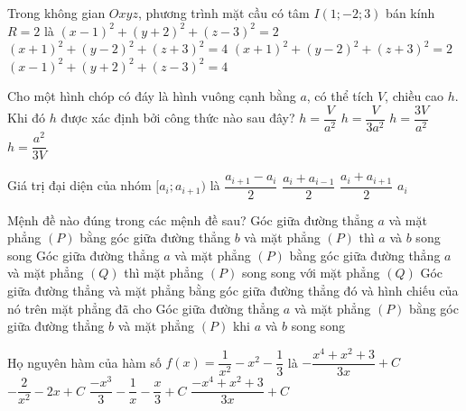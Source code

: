 \begin{ex}%
	Trong không gian $Oxyz$, phương trình mặt cầu có tâm $I(1;-2;3)$ bán kính $R=2$ là
	\choice
	{$(x-1)^2+(y+2)^2+(z-3)^2=2$}
	{$(x+1)^2+(y-2)^2+(z+3)^2=4$}
	{$(x+1)^2+(y-2)^2+(z+3)^2=2$}
	{\True $(x-1)^2+(y+2)^2+(z-3)^2=4$}
\end{ex}

\begin{ex}%
	Cho một hình chóp có đáy là hình vuông cạnh bằng $a$, có thể tích $V$, chiều cao $h$. Khi đó $h$ được xác định bởi công thức nào sau đây?
	\choice
	{$h=\dfrac{V}{a^2}$}
	{$h=\dfrac{V}{3a^2}$}
	{\True $h=\dfrac{3V}{a^2}$}
	{$h=\dfrac{a^2}{3V}$}
\end{ex}

\begin{ex}%
	Giá trị đại diện của nhóm $[a_i;a_{i+1})$ là
	\choice
	{$\dfrac{a_{i+1}-a_i}{2}$}
	{$\dfrac{a_i+a_{i-1}}{2}$}
	{\True $\dfrac{a_i+a_{i+1}}{2}$}
	{$a_i$}
	\loigiai{
Giá trị đại diện của nhóm $[a_i;a_{i+1})$ là $\dfrac{a_i+a_{i+1}}{2}$.
	}
\end{ex}

\begin{ex}%
	Mệnh đề nào đúng trong các mệnh đề sau?
	\choice
	{Góc giữa đường thẳng $a$ và mặt phẳng $(P)$ bằng góc giữa đường thẳng $b$ và mặt phẳng $(P)$ thì $a$ và $b$ song song}
	{Góc giữa đường thẳng $a$ và mặt phẳng $(P)$ bằng góc giữa đường thẳng $a$ và mặt phẳng $(Q)$ thì mặt phẳng $(P)$ song song với mặt phẳng $(Q)$}
	{\True Góc giữa đường thẳng và mặt phẳng bằng góc giữa đường thẳng đó và hình chiếu của nó trên mặt phẳng đã cho}
	{Góc giữa đường thẳng $a$ và mặt phẳng $(P)$ bằng góc giữa đường thẳng $b$ và mặt phẳng $(P)$ khi $a$ và $b$ song song}
\end{ex}

\begin{ex}%
	Họ nguyên hàm của hàm số $f(x)=\dfrac{1}{x^2}-x^2-\dfrac{1}{3}$ là
	\choice
	{$-\dfrac{x^4+x^2+3}{3x}+C$}
	{$-\dfrac{2}{x^2}-2x+C$}
	{\True $\dfrac{-x^3}{3}-\dfrac{1}{x}-\dfrac{x}{3}+C$}
	{$\dfrac{-x^4+x^2+3}{3x}+C$}
\end{ex}

